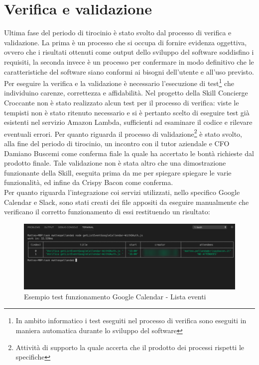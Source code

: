 
\chapter{Verifica e validazione}
\label{cap:verifica_validazione}
Ultima fase del periodo di tirocinio è stato svolto dal processo di verifica e validazione. La prima è un processo che si occupa di fornire evidenza oggettiva, ovvero che i risultati ottenuti come output dello sviluppo del software soddisfino i requisiti, la seconda invece è un processo per confermare in modo definitivo che le caratteristiche del software siano conformi ai bisogni dell'utente e all'uso previsto.
Per eseguire la verifica e la validazione è necessario l'esecuzione di test\footnote{In ambito informatico i test eseguiti nel processo di verifica sono eseguiti in maniera automatica durante lo sviluppo del software} che individuino carenze, correttezza e affidabilità. Nel progetto della Skill Concierge Croccante non è stato realizzato alcun test per il processo di verifica: viste le tempisti non è stato ritenuto necessario e si è pertanto scelto di eseguire test già esistenti nel servizio Amazon Lambda, sufficienti ad esaminare il codice e rilevare eventuali errori. Per quanto riguarda il processo di validazione\footnote{Attività di supporto la quale accerta che il prodotto dei processi rispetti le specifiche} è stato svolto, alla fine del periodo di tirocinio, un incontro  con il tutor aziendale e CFO Damiano Buscemi come conferma fiale la quale ha accertato le bontà richieste dal prodotto finale. Tale validazione non è stata altro che una dimostrazione funzionante della Skill, eseguita prima da me per spiegare spiegare le varie funzionalità, ed infine da Crispy Bacon come conferma.
\\[0.5cm]
\noindent Per quanto riguarda l'integrazione coi servizi utilizzati, nello specifico Google Calendar e Slack, sono stati creati dei file appositi da eseguire manualmente che verificano il corretto funzionamento di essi restituendo un risultato:
\begin{figure}[H]
	\includegraphics[width=13cm]{immagini/test-googleCalendar.png}
	\caption{\label{fig:test_googleCalendar}Esempio test funzionamento Google Calendar - Lista eventi}
\end{figure}
